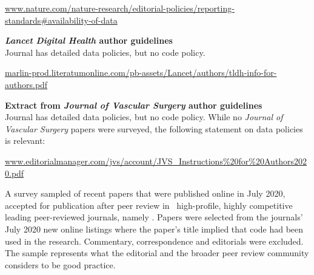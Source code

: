\documentclass[10pt,a4paper]{article}
\begin{document}
\specifyurl
\url{www.nature.com/nature-research/editorial-policies/reporting-standards#availability-of-data}

\noindent\textbf{\emph{Lancet Digital Health\/} author guidelines}\\
Journal has detailed data policies, but no code policy.

\specifyurl
\url{marlin-prod.literatumonline.com/pb-assets/Lancet/authors/tldh-info-for-authors.pdf}

\noindent\textbf{Extract from \emph{Journal of Vascular Surgery\/} author guidelines}\\
Journal has detailed data policies, but no code policy. While no \emph{Journal of Vascular Surgery\/} papers were surveyed, the following statement on data policies is relevant:

\vskip 3mm 
\specifyurl
\url{www.editorialmanager.com/jvs/account/JVS_Instructions%20for%20Authors2020.pdf}

\label{data-methods-section}
\label{data-methods-subsection}
A survey sampled of recent papers that were published online in July 2020, accepted for publication after peer review in \the\numberOfJournals\ high-profile, highly competitive leading peer-reviewed journals, namely \journalBreakdown. Papers were selected from the journals' July 2020 new online listings where the paper's title implied that code had been used in the research. Commentary, correspondence and editorials were excluded. The sample represents what the editorial and the broader peer review community considers to be good practice. 
\end{document}
